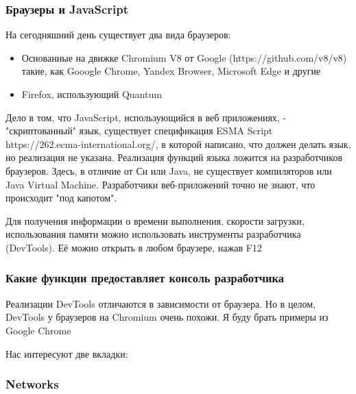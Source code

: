 \documentclass[12pt]{article}
\begin{document}
\subsubsection{Браузеры и JavaScript}

На сегодняшний день существует два вида браузеров:

\begin{itemize}[label=-]
    \item Основанные на движке Chromium V8 от Google (https://github.com/v8/v8) такие,
          как Gooogle Chrome, Yandex Browser, Microsoft Edge и другие
    \item Firefox, использующий Quantum
\end{itemize}

Дело в том, что JavaScript, использующийся в веб приложениях,
- "скриптованный" язык, существует спецификация ESMA Script https://262.ecma-international.org/,
в которой написано, что должен делать язык, но реализация не указана.
Реализация функций языка ложится на разработчиков браузеров.
Здесь, в отличие от Си или Java, не существует компиляторов или Java Virtual Machine.
Разработчики веб-приложений точно не знают, что происходит "под капотом".

Для получения информации о времени выполнения, скорости загрузки,
использования памяти можно использовать инструменты разработчика (DevTools).
Её можно открыть в любом браузере, нажав F12

\subsubsection{Какие функции предоставляет консоль разработчика}

Реализации DevTools отличаются в зависимости от браузера.
Но в целом, DevTools у браузеров на Chromium очень похожи.
Я буду брать примеры из Google Chrome

Нас интересуют две вкладки:

\subsubsection{Networks}
\end{document}
